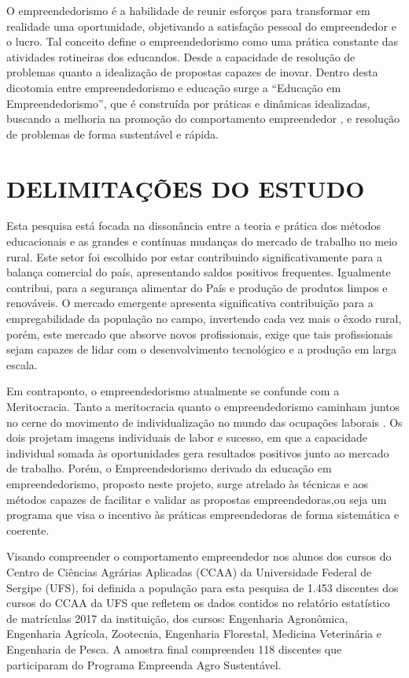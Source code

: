 O empreendedorismo é a habilidade de reunir esforços para transformar em realidade uma oportunidade, objetivando a satisfação pessoal do empreendedor e o lucro. Tal conceito define o empreendedorismo como uma prática constante das atividades rotineiras dos educandos. Desde a capacidade de resolução de problemas quanto a idealização de propostas capazes de inovar. Dentro desta dicotomia entre empreendedorismo e educação surge a “Educação em Empreendedorismo”, que é construída por práticas e dinâmicas idealizadas, buscando a melhoria na promoção do comportamento empreendedor \cite{martins_educacao_2016, morais_empreendedorismo_2018}, e resolução de problemas de forma sustentável e rápida.

\section{DELIMITAÇÕES DO ESTUDO}

Esta pesquisa está focada na dissonância entre a teoria e prática dos métodos educacionais e as grandes e contínuas mudanças do mercado de trabalho no meio rural. Este setor foi escolhido por estar contribuindo significativamente para a balança comercial do país, apresentando saldos positivos frequentes. Igualmente contribui, para a segurança alimentar do País e produção de produtos limpos e renováveis. O mercado emergente apresenta significativa contribuição para a empregabilidade da população no campo, invertendo cada vez mais o êxodo rural, porém, este mercado que absorve novos profissionais, exige que tais profissionais sejam capazes de lidar com o desenvolvimento tecnológico e a produção em larga escala. 

Em contraponto, o empreendedorismo atualmente se confunde com a Meritocracia. Tanto a meritocracia quanto o empreendedorismo caminham juntos no cerne do movimento de individualização no mundo das ocupações laborais \cite{costa_novo_2019}. Os dois projetam imagens individuais de labor e sucesso, em que a capacidade individual somada às oportunidades gera resultados positivos junto ao mercado de trabalho. Porém, o Empreendedorismo derivado da educação em empreendedorismo, proposto neste projeto, surge atrelado às técnicas e aos métodos capazes de facilitar e validar as propostas empreendedoras,ou seja um programa que visa o incentivo às práticas empreendedoras de forma sistemática e coerente.

Visando compreender o comportamento empreendedor nos alunos dos cursos do Centro de Ciências Agrárias Aplicadas (CCAA) da Universidade Federal de Sergipe (UFS), foi definida a população para esta pesquisa de 1.453 discentes dos cursos do CCAA da UFS que refletem os dados contidos no relatório estatístico de matrículas 2017 da instituição, dos cursos: Engenharia Agronômica, Engenharia Agrícola, Zootecnia, Engenharia Florestal, Medicina Veterinária e Engenharia de Pesca. A amostra final compreendeu 118 discentes que participaram do Programa Empreenda Agro Sustentável.

